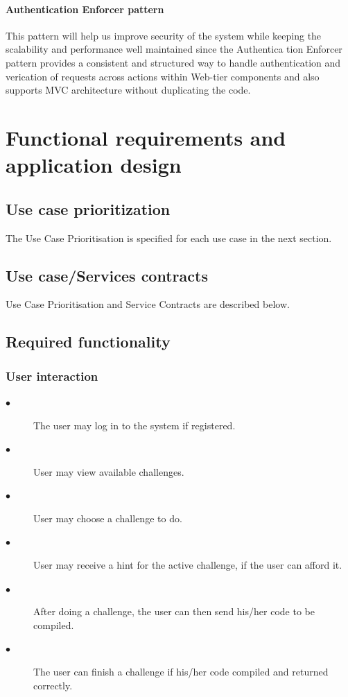 \documentclass[english]{article}
\begin{document}
		\paragraph{Authentication Enforcer pattern} %
		
		This pattern will help us improve security of the system while keeping
		the scalability and performance well maintained since the Authentica
		tion Enforcer pattern provides a consistent and structured way to handle
		authentication and verication of requests across actions within Web-tier
		components and also supports MVC architecture without duplicating the
		code.	
		
		
	
	\newpage
	\section{Functional requirements and application design}
		\subsection{Use case prioritization}
		The Use Case Prioritisation is specified for each use case in the next section.
		
		
		\subsection{Use case/Services contracts}
		Use Case Prioritisation and Service Contracts are described below.
				
		\subsection{Required functionality}
		\subsubsection{User interaction}
		\begin{description}
			\item[$\bullet$] The user may log in to the system if registered.
			\item[$\bullet$] User may view available challenges.
			\item[$\bullet$] User may choose a challenge to do.
			\item[$\bullet$] User may receive a hint for the active challenge, if the user can afford it.
			\item[$\bullet$] After doing a challenge, the user can then send his/her code to be compiled.
			\item[$\bullet$] The user can finish a challenge if his/her code compiled and returned correctly.
		\end{description}
		
\end{document}
